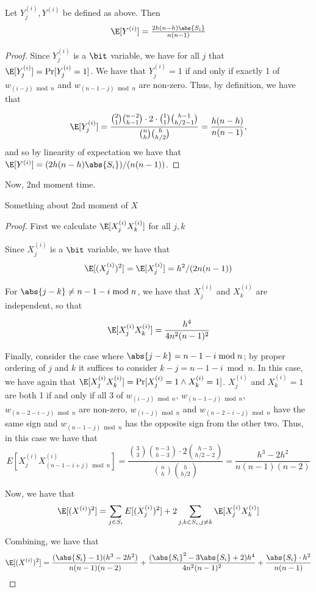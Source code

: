 \begin{lemma}
\label{lem:expof1}
Let $Y^{(i)}_j, Y^{(i)}$ be defined as above. Then 
\[\E[Y^{(i)}]=\tfrac{2h(n-h)\abs{S_i}}{n(n-1)}\]
\end{lemma}

\begin{proof}
Since $Y^{(i)}_j$ is a $\bit$ variable, we have for all $j$ that
$\E[Y^{(i)}_j]=\Pr[Y^{(i)}_j=1]$. We have that $Y^{(i)}_j=1$ if and only if exactly 1 of 
$w_{(i-j) \bmod{n}}$ and $w_{(n-1-j) \bmod{n}}$ are non-zero. Thus, by definition, we have that 

\[\E[Y^{(i)}_j]=\frac{\binom{2}{1}\binom{n-2}{h-1}\cdot 2\cdot \binom{1}{1}\binom{h-1}{h/2-1}}{\binom{n}{h}
    \binom{h}{h/2}} = \frac{h(n-h)}{n(n-1)},\] and so by linearity of
expectation we have that $\E[Y^{(i)}]=(2h(n-h)\abs{S_i})/(n(n-1))$.  
\end{proof}

Now, 2nd moment time. 

\begin{lemma}
Something about 2nd moment of $X$
\end{lemma}

\begin{proof}
First we calculate $\E[X^{(i)}_jX^{(i)}_k]$ for all $j,k$


Since $X^{(i)}_j$ is a $\bit$ variable, we have that
\[\E[(X^{(i)}_j)^2]=\E[X^{(i)}_j]=h^2/(2n(n-1))\]

For $\abs{j - k} \neq n - 1 - i \bmod{n}$, we have that $X^{(i)}_j$
and $X^{(i)}_k$ are independent, so that 

\[\E[X^{(i)}_jX^{(i)}_k]=\frac{h^4}{4n^2(n-1)^2}\]

Finally, consider the case where $\abs{j-k} = n - 1 - i \bmod{n}$; by
proper ordering of $j$ and $k$ it suffices to consider
$k-j=n-1-i\bmod{n}$. In this case, we have again that 
$\E[X^{(i)}_jX^{(i)}_k]=\Pr[X^{(i)}_j=1 \wedge
X^{(i)}_k=1]$. $X^{(i)}_j$ and $X^{(i)}_k=1$ are both 1 if and only if
all 3 of $w_{(i-j) \bmod{n}}$, $w_{(n-1-j) \bmod{n}}$, $w_{(n-2-i-j)
  \bmod{n}}$ are non-zero, $w_{(i-j) \bmod{n}}$ and  $w_{(n-2-i-j)
  \bmod{n}}$ have the same sign and $w_{(n-1-j) \bmod{n}}$ has the
  opposite sign from the other two. Thus, in this case we have that 
\[E[X^{(i)}_jX^{(i)}_{(n-1-i+j)\bmod{n}}]=\frac{\binom{3}{3}\binom{n-3}{h-3}\cdot
  2\binom{h-3}{h/2-2}}{\binom{n}{h}\binom{h}{h/2}}=\frac{h^3-2h^2}{n(n-1)(n-2)}\]


Now, we have that 
\[\E[(X^{(i)})^2]=\sum_{j \in S_i}E[(X^{(i)}_j)^2] + 2\sum_{j,k \in
    S_i, j\neq k}\E[X^{(i)}_jX^{(i)}_k]\]

Combining, we have that 
\[\E[(X^{(i)})^2]=\frac{(\abs{S_i}-1)(h^3-2h^2)}{n(n-1)(n-2)}+\frac{(\abs{S_i}^2-3\abs{S_i}+2)h^4}{4n^2(n-1)^2}+\frac{\abs{S_i}\cdot h^2}{n(n-1)}\]
\end{proof}




